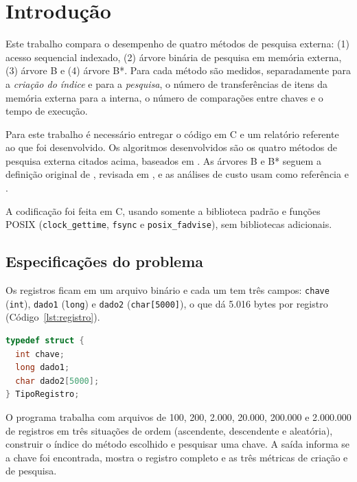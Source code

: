 \documentclass{article}
\begin{document}


\section{Introdução}

Este trabalho compara o desempenho de quatro métodos de pesquisa externa: (1) acesso sequencial indexado, (2) árvore binária de pesquisa em memória externa, (3) árvore B e (4) árvore B*. Para cada método são medidos, separadamente para a \emph{criação do índice} e para a \emph{pesquisa}, o número de transferências de itens da memória externa para a interna, o número de comparações entre chaves e o tempo de execução.

Para este trabalho é necessário entregar o código em C e um relatório referente ao que foi desenvolvido. Os algoritmos desenvolvidos são os quatro métodos de pesquisa externa citados acima, baseados em \cite{ziviani}. As árvores B e B* seguem a definição original de \cite{bayer1972}, revisada em \cite{comer1979}, e as análises de custo usam como referência \cite{knuth1998} e \cite{cormen2009}.

A codificação foi feita em C, usando somente a biblioteca padrão e funções POSIX (\texttt{clock\_gettime}, \texttt{fsync} e \texttt{posix\_fadvise}), sem bibliotecas adicionais.

\subsection{Especificações do problema}

Os registros ficam em um arquivo binário e cada um tem três campos: \texttt{chave} (\texttt{int}), \texttt{dado1} (\texttt{long}) e \texttt{dado2} (\texttt{char[5000]}), o que dá 5.016 bytes por registro (Código~\ref{lst:registro}).

\begin{lstlisting}[caption={Definição do registro (registro.h).},label={lst:registro},language=C]
typedef struct {
  int chave;
  long dado1;
  char dado2[5000];
} TipoRegistro;
\end{lstlisting}

O programa trabalha com arquivos de 100, 200, 2.000, 20.000, 200.000 e 2.000.000 de registros em três situações de ordem (ascendente, descendente e aleatória), construir o índice do método escolhido e pesquisar uma chave. A saída informa se a chave foi encontrada, mostra o registro completo e as três métricas de criação e de pesquisa.
\end{document}
